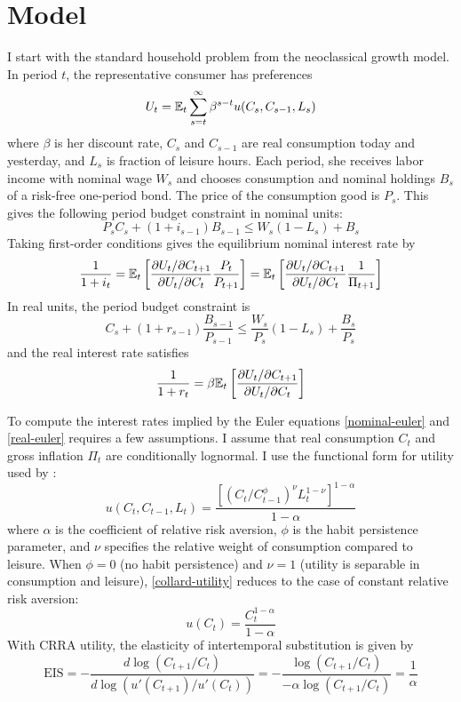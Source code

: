 \section{Model}
I start with the standard household problem from the neoclassical growth model. In period $t$, the representative consumer has preferences $$U_t = \mathbb{E}_t \sum_{s=t}^\infty \beta^{s-t} u(C_s, C_{s-1}, L_s)$$ where $\beta$ is her discount rate, $C_s$ and $C_{s-1}$ are real consumption today and yesterday, and $L_s$ is fraction of leisure hours. Each period, she receives labor income with nominal wage $W_s$ and chooses consumption and nominal holdings $B_s$ of a risk-free one-period bond. The price of the consumption good is $P_s$. This gives the following period budget constraint in nominal units: $$P_s C_s + (1 + i_{s-1})B_{s-1} \leq W_s(1 - L_s) + B_s$$
Taking first-order conditions gives the equilibrium nominal interest rate by
\begin{equation}
\label{nominal-euler}
\frac{1}{1 + i_t} = \mathbb{E}_t \left[  \frac{\partial U_t / \partial C_{t+1}}{\partial U_t / \partial C_t} \frac{P_t}{P_{t+1}}  \right] = \mathbb{E}_t \left[  \frac{\partial U_t / \partial C_{t+1}}{\partial U_t / \partial C_t} \frac{1}{\Pi_{t+1}}  \right]
\end{equation}
In real units, the period budget constraint is $$C_s + (1 + r_{s-1}) \frac{B_{s-1}}{P_{s-1}} \leq \frac{W_s}{P_s}(1 - L_s) + \frac{B_s}{P_s}$$ and the real interest rate satisfies
\begin{equation}
\label{real-euler}
\frac{1}{1 + r_t} = \beta \mathbb{E}_t \left[  \frac{\partial U_t / \partial C_{t+1}}{\partial U_t / \partial C_t}  \right]
\end{equation}

To compute the interest rates implied by the Euler equations \eqref{nominal-euler} and \eqref{real-euler} requires a few assumptions. I assume that real consumption $C_t$ and gross inflation $\Pi_t$ are conditionally lognormal. I use the functional form for utility used by \cite{collard11}:
\begin{equation}
\label{collard-utility}
u(C_t, C_{t-1}, L_t) = \frac{[(C_t/C_{t-1}^\phi)^\nu L_t^{1-\nu}]^{1-\alpha}}{1-\alpha}
\end{equation}
where $\alpha$ is the coefficient of relative risk aversion, $\phi$ is the habit persistence parameter, and $\nu$ specifies the relative weight of consumption compared to leisure. When $\phi = 0$ (no habit persistence) and $\nu = 1$ (utility is separable in consumption and leisure), \eqref{collard-utility} reduces to the case of constant relative risk aversion:
\begin{equation}
\label{crra-utility}
u(C_t) = \frac{C_t^{1-\alpha}}{1-\alpha}
\end{equation}
With CRRA utility, the elasticity of intertemporal substitution is given by $$\mathrm{EIS} = -\frac{d \log(C_{t+1}/C_t)}{d \log (u'(C_{t+1})/u'(C_t))} = -\frac{\log(C_{t+1}/C_t)}{-\alpha \log(C_{t+1}/C_t)} = \frac{1}{\alpha}$$

